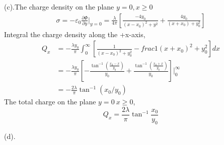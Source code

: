\documentclass{article}
\begin{document}
 (c).The charge density on the plane $y=0, x\geq 0$
 \begin{align*}
   \sigma=-\varepsilon_0\frac{\partial \Phi}{\partial y}|_{y=0}=\frac{\lambda}{4\pi}[\frac{-4y_0}{(x-x_0)^2+y^2}+\frac{4y_0}{(x+x_0)+y_0^2}]
 \end{align*}
 Integral the charge density along the +x-axis,
 \begin{align*}
   Q_x&=-\frac{\lambda y_0}{\pi}\int_0^\infty[\frac{1}{(x-x_0)^2+y_0^2}-frac{1}{(x+x_0)^2+y_0^2}]dx\\
      &=-\frac{\lambda y_0}{\pi}[-\frac{\tan^{-1}(\frac{x_0-x}{y_0})}{y_0}+\frac{\tan^{-1}(\frac{x_0+x}{y_0})}{y_0}]|_0^\infty\\
      &=-\frac{2\lambda}{\pi}\tan^{-1}(x_0/y_0)
 \end{align*}
 The total charge on the plane $y=0\ x\geq 0$,
  \[ \boxed{Q_x=\frac{2\lambda}{\pi}\tan^{-1}\frac{x_0}{y_0}} \]\par
  (d).
 \pagebreak
\end{document}
